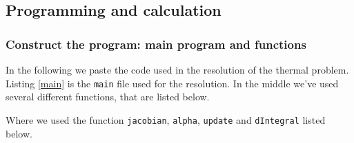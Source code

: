 \subsection{Programming and calculation}
\subsubsection{Construct the program: main program and functions}
In the following we paste the code used in the resolution of the thermal problem. 
Listing \ref{main} is the \texttt{main} file used for the resolution. In the middle we've used several different functions, that are listed below.



Where we used the function \texttt{jacobian}, \texttt{alpha}, \texttt{update} and \texttt{dIntegral} listed below.




 












